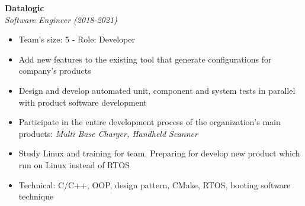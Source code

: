 \documentclass[10pt,oneside,a4paper]{article}
\begin{document}
\begin{tcolorbox}
\begin{minipage}[t]{11cm}
\begin{tcolorbox}[grow to right by=0.75cm,colback=white,colframe=white]
\begin{itemize}
                {
                    \textbf{Datalogic} \\
                    \emph{Software Engineer (2018-2021)}
                    \begin{itemize}[label=$\circ$]
                        \item {Team's size: 5 - Role: Developer}
                        \item {Add new features to the existing tool that generate configurations for company's products}
                        \item {Design and develop automated unit, component and system tests in 
                        parallel with product software development}
                        \item {Participate in the entire development process of the organization's main products: 
                        \textit{Multi Base Charger, Handheld Scanner}}
                        \item {Study Linux and training for team. Preparing for develop new product which run on Linux instead of RTOS}
                        \item {Technical: C/C++, OOP, design pattern, CMake, RTOS, booting software technique}
                    \end{itemize}
                }
            \end{itemize}
        \end{tcolorbox}
    \end{minipage}

\end{tcolorbox}

\newpage
\end{document}
